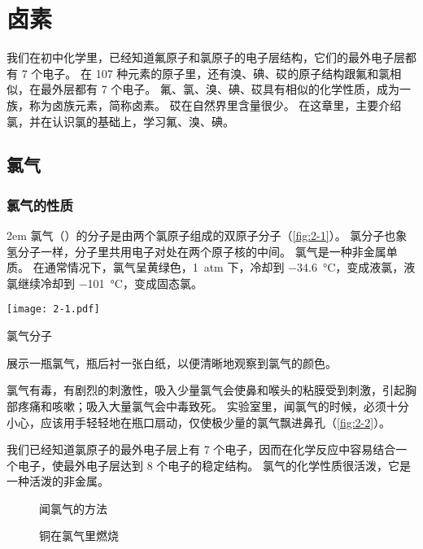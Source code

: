 \chapter{卤素}\label{chp:halogen}
我们在初中化学里，已经知道氟原子和氯原子的电子层结构，它们的最外电子层都有 7 个电子。
在 107 种元素的原子里，还有溴、碘、砹的原子结构跟氟和氯相似，在最外层都有 7 个电子。
氟、氯、溴、碘、砹具有相似的化学性质，成为一族，称为卤族元素，简称卤素。
砹在自然界里含量很少。
在这章里，主要介绍氯，并在认识氯的基础上，学习氟、溴、碘。

\section{氯气}
\subsection{氯气的性质}
\medskip\noindent
\begin{minipage}{0.52\linewidth}\parindent2em
氯气（）的分子是由两个氯原子\footnotemark[1]组成的双原子分子（\cref{fig:2-1}）。 
氯分子也象氢分子一样，分子里共用电子对处在两个原子核的中间。 
氯气是一种非金属单质。
在通常情况下，氯气呈黄绿色，\qty{1}{atm} 下，冷却到 \qty{-34.6}{\celsius}，变成液氯，液氯继续冷却到 \qty{-101}{\celsius}，变成固态氯。
\end{minipage}\hfill
\begin{minipage}{0.43\linewidth}\centering
\begin{figurehere}
  \texttt{[image: 2-1.pdf]}
  \caption{氯气分子}\label{fig:2-1}
\end{figurehere}
\end{minipage}

\begin{Experiment}
  展示一瓶氯气，瓶后衬一张白纸，以便清晰地观察到氯气的颜色。
\end{Experiment}

氯气有毒，有剧烈的刺激性，吸入少量氯气会使鼻和喉头的粘膜受到刺激，引起胸部疼痛和咳嗽；吸入大量氯气会中毒致死。
实验室里，闻氯气的时候，必须十分小心，应该用手轻轻地在瓶口扇动，仅使极少量的氯气飘进鼻孔（\cref{fig:2-2}）。

我们已经知道氯原子的最外电子层上有 7 个电子，因而在化学反应中容易结合一个电子，使最外电子层达到 8 个电子的稳定结构。
氯气的化学性质很活泼，它是一种活泼的非金属。
\begin{figure}
  \begin{minipage}[b]{0.48\linewidth}\centering
    \caption{闻氯气的方法}\label{fig:2-2}
  \end{minipage}
  \begin{minipage}[b]{0.48\linewidth}\centering
    \caption{铜在氯气里燃烧}\label{fig:2-3}
  \end{minipage}
\end{figure}

